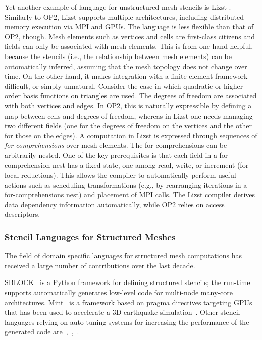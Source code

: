Yet another example of language for unstructured mesh stencils is Lizst \citep{lizst}. Similarly to OP2, Lizst supports multiple architectures, including distributed-memory execution via MPI and GPUs. The language is less flexible than that of OP2, though. Mesh elements such as vertices and cells are first-class citizens and fields can only be associated with mesh elements. This is from one hand helpful, because the stencils (i.e., the relationship between mesh elements) can be automatically inferred, assuming that the mesh topology does not change over time. On the other hand, it makes integration with a finite element framework difficult, or simply unnatural. Consider the case in which quadratic or higher-order basis functions on triangles are used. The degrees of freedom are associated with both vertices and edges. In OP2, this is naturally expressible by defining a map between cells and degrees of freedom, whereas in Lizst one needs managing two different fields (one for the degrees of freedom on the vertices and the other for those on the edges). A computation in Lizst is expressed through sequences of {\em for-comprehensions} over mesh elements. The for-comprehensions can be arbitrarily nested. One of the key prerequisites is that each field in a for-comprehension nest has a fixed state, one among read, write, or increment (for local reductions). This allows the compiler to automatically perform useful actions such as scheduling transformations (e.g., by rearranging iterations in a for-comprehensions nest) and placement of MPI calls. The Lizst compiler derives data dependency information automatically, while OP2 relies on access descriptors. 

\subsubsection{Stencil Languages for Structured Meshes}
The field of domain specific languages for structured mesh computations has received a large number of contributions over the last decade. 

SBLOCK~\cite{sblock-cite} is a Python framework for defining structured stencils; the run-time supports automatically generates low-level code for multi-node many-core architectures. Mint~\cite{mint-cite} is a framework based on pragma directives targeting GPUs that has been used to accelerate a 3D earthquake simulation~\cite{mint-simulation-cite}. Other stencil languages relying on auto-tuning systems for increasing the performance of the generated code are~\cite{zhang-mueller-cite},~\cite{datta-cite},~\cite{patus}.

